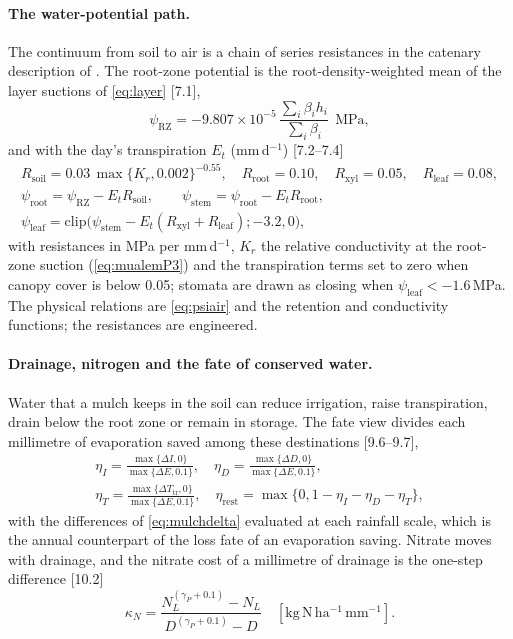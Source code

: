 \paragraph{The water-potential path.} The continuum from soil to air is a chain of series resistances in the catenary description of \citet{vandenHonert1948}. The root-zone potential is the root-density-weighted mean of the layer suctions of \cref{eq:layer} [7.1],
\begin{equation}
\psi_{\mathrm{RZ}}=-9.807\times10^{-5}\,\frac{\sum_i\beta_ih_i}{\sum_i\beta_i}\ \ \mathrm{MPa},
\label{eq:psisoil}
\end{equation}
and with the day's transpiration $E_t$ (mm\,d$^{-1}$) [7.2--7.4]
\begin{equation}
\begin{gathered}
R_{\mathrm{soil}}=0.03\,\max\{K_r,0.002\}^{-0.55},\quad R_{\mathrm{root}}=0.10,\quad R_{\mathrm{xyl}}=0.05,\quad R_{\mathrm{leaf}}=0.08,\\
\psi_{\mathrm{root}}=\psi_{\mathrm{RZ}}-E_tR_{\mathrm{soil}},\qquad \psi_{\mathrm{stem}}=\psi_{\mathrm{root}}-E_tR_{\mathrm{root}},\\ \psi_{\mathrm{leaf}}=\mathrm{clip}\bigl(\psi_{\mathrm{stem}}-E_t(R_{\mathrm{xyl}}+R_{\mathrm{leaf}});-3.2,0\bigr),
\end{gathered}
\label{eq:spac}
\end{equation}
with resistances in MPa per mm\,d$^{-1}$, $K_r$ the relative conductivity at the root-zone suction (\cref{eq:mualemP3}) and the transpiration terms set to zero when canopy cover is below 0.05; stomata are drawn as closing when $\psi_{\mathrm{leaf}}<-1.6$\,MPa. The physical relations are \cref{eq:psiair} and the retention and conductivity functions; the resistances are engineered.

\paragraph{Drainage, nitrogen and the fate of conserved water.}
\label{sec:sys-fate}
Water that a mulch keeps in the soil can reduce irrigation, raise transpiration, drain below the root zone or remain in storage. The fate view divides each millimetre of evaporation saved among these destinations [9.6--9.7],
\begin{equation}
\begin{gathered}\eta_I=\frac{\max\{\Delta I,0\}}{\max\{\Delta E,0.1\}},\quad \eta_D=\frac{\max\{\Delta D,0\}}{\max\{\Delta E,0.1\}},\\ \eta_T=\frac{\max\{\Delta T_{\mathrm{tr}},0\}}{\max\{\Delta E,0.1\}},\quad \eta_{\mathrm{rest}}=\max\{0,1-\eta_I-\eta_D-\eta_T\},\end{gathered}
\label{eq:fate}
\end{equation}
with the differences of \cref{eq:mulchdelta} evaluated at each rainfall scale, which is the annual counterpart of the loss fate of an evaporation saving. Nitrate moves with drainage, and the nitrate cost of a millimetre of drainage is the one-step difference [10.2]
\begin{equation}
\kappa_N=\frac{N_L^{(\gamma_P+0.1)}-N_L}{D^{(\gamma_P+0.1)}-D}\quad[\mathrm{kg\,N\,ha^{-1}\,mm^{-1}}].
\label{eq:kappaN}
\end{equation}

